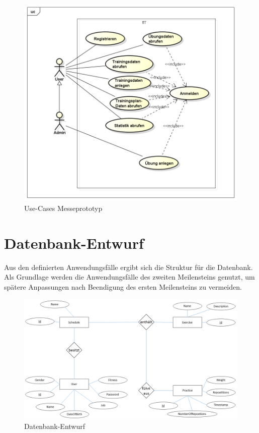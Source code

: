 \begin{figure}[h]
\centering
\includegraphics[width=0.8\linewidth]{content/images/UseCase-Messeprototyp.png}
\caption{Use-Cases Messeprototyp}
\label{pic:usecase-messe}
\end{figure}
\newpage
\section{Datenbank-Entwurf}
\label{sec:Datenbank-Entwurf}
Aus den definierten Anwendungsfälle ergibt sich die Struktur für die Datenbank. Als Grundlage werden die Anwendungsfälle des zweiten Meilensteins genutzt, um spätere Anpassungen nach Beendigung des ersten Meilensteins zu vermeiden.

\begin{figure}[h]
\centering
\includegraphics[width=0.8\linewidth]{content/images/DB-Entwurf.png}
\caption{Datenbank-Entwurf}
\label{pic:db-entwurf}
\end{figure}

